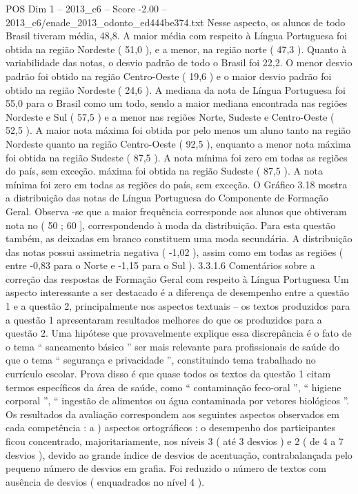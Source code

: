 \begin{textsample}{POS Dim 1 – 2013\_c6 – Score -2.00 – 2013\_c6/enade\_2013\_odonto\_ed444be374.txt}
Nesse aspecto, os alunos de todo Brasil tiveram média, 48,8.
A maior média com respeito à Língua Portuguesa foi obtida na região Nordeste ( 51,0 ), e a menor, na região norte ( 47,3 ).
Quanto à variabilidade das notas, o desvio padrão de todo o Brasil foi 22,2.
O menor desvio padrão foi obtido na região Centro-Oeste ( 19,6 ) e o maior desvio padrão foi obtido na região Nordeste ( 24,6 ).
A mediana da nota de Língua Portuguesa foi 55,0 para o Brasil como um todo, sendo a maior mediana encontrada nas regiões Nordeste e Sul ( 57,5 ) e a menor nas regiões Norte, Sudeste e Centro-Oeste ( 52,5 ).
A maior nota máxima foi obtida por pelo menos um aluno tanto na região Nordeste quanto na região Centro-Oeste ( 92,5 ), enquanto a menor nota máxima foi obtida na região Sudeste ( 87,5 ).
A nota mínima foi zero em todas as regiões do país, sem exceção. máxima foi obtida na região Sudeste ( 87,5 ).
A nota mínima foi zero em todas as regiões do país, sem exceção.
O Gráfico 3.18 mostra a distribuição das notas de Língua Portuguesa do Componente de Formação Geral.
Observa -se que a maior frequência corresponde aos alunos que obtiveram nota no ( 50 ; 60 ], correspondendo à moda da distribuição.
Para esta questão também, as deixadas em branco constituem uma moda secundária.
A distribuição das notas possui assimetria negativa ( -1,02 ), assim como em todas as regiões ( entre -0,83 para o Norte e -1,15 para o Sul ). 3.3.1.6 Comentários sobre a correção das respostas de Formação Geral com respeito à Língua Portuguesa Um aspecto interessante a ser destacado é a diferença de desempenho entre a questão 1 e a questão 2, principalmente nos aspectos textuais – os textos produzidos para a questão 1 apresentaram resultados melhores do que os produzidos para a questão 2.
Uma hipótese que provavelmente explique essa discrepância é o fato de o tema “ saneamento básico ” ser mais relevante para profissionais de saúde do que o tema “ segurança e privacidade ”, constituindo tema trabalhado no currículo escolar.
Prova disso é que quase todos os textos da questão 1 citam termos específicos da área de saúde, como “ contaminação feco-oral ”, “ higiene corporal ”, “ ingestão de alimentos ou água contaminada por vetores biológicos ”.
Os resultados da avaliação correspondem aos seguintes aspectos observados em cada competência : a ) aspectos ortográficos : o desempenho dos participantes ficou concentrado, majoritariamente, nos níveis 3 ( até 3 desvios ) e 2 ( de 4 a 7 desvios ), devido ao grande índice de desvios de acentuação, contrabalançada pelo pequeno número de desvios em grafia.
Foi reduzido o número de textos com ausência de desvios ( enquadrados no nível 4 ).

\end{textsample}
